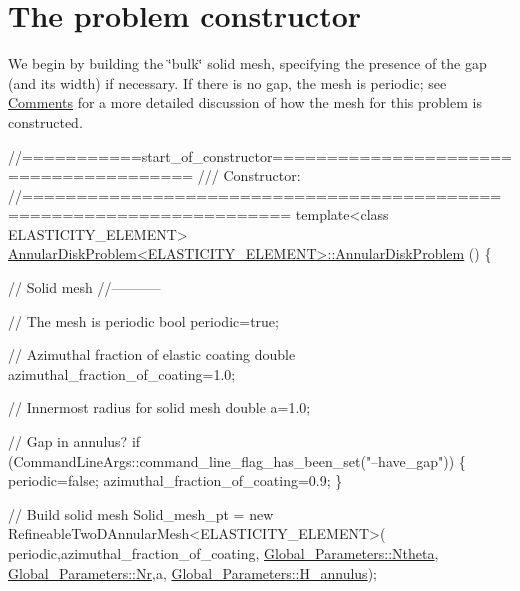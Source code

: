  

\hypertarget{index_constructor}{}\section{The problem constructor}\label{index_constructor}
We begin by building the \char`\"{}bulk\char`\"{} solid mesh, specifying the presence of the gap (and its width) if necessary. If there is no gap, the mesh is periodic; see \hyperlink{index_comments}{Comments} for a more detailed discussion of how the mesh for this problem is constructed.

 
\begin{DoxyCodeInclude}
\textcolor{comment}{//===========start\_of\_constructor======================================= }
\textcolor{comment}{/// Constructor: }
\textcolor{comment}{}\textcolor{comment}{//====================================================================== }
\textcolor{keyword}{template}<\textcolor{keyword}{class} ELASTICITY\_ELEMENT>
\hyperlink{classAnnularDiskProblem_aad1ce56fa5c26045fb14d46acf29c89e}{AnnularDiskProblem<ELASTICITY\_ELEMENT>::AnnularDiskProblem}
      () 
\{
 
 \textcolor{comment}{// Solid mesh}
 \textcolor{comment}{//-----------}

 \textcolor{comment}{// The mesh is periodic }
 \textcolor{keywordtype}{bool} periodic=\textcolor{keyword}{true};

 \textcolor{comment}{// Azimuthal fraction of elastic coating}
 \textcolor{keywordtype}{double} azimuthal\_fraction\_of\_coating=1.0;

 \textcolor{comment}{// Innermost radius for solid mesh}
 \textcolor{keywordtype}{double} a=1.0;
 
 \textcolor{comment}{// Gap in annulus?}
 \textcolor{keywordflow}{if} (CommandLineArgs::command\_line\_flag\_has\_been\_set(\textcolor{stringliteral}{"--have\_gap"}))
  \{
   periodic=\textcolor{keyword}{false};
   azimuthal\_fraction\_of\_coating=0.9;
  \}

\end{DoxyCodeInclude}



\begin{DoxyCodeInclude}
 \textcolor{comment}{// Build solid mesh}
 Solid\_mesh\_pt = \textcolor{keyword}{new} 
  RefineableTwoDAnnularMesh<ELASTICITY\_ELEMENT>(
   periodic,azimuthal\_fraction\_of\_coating,
   \hyperlink{namespaceGlobal__Parameters_a1f67286edeb13ef67687fd483e105b5e}{Global\_Parameters::Ntheta},
   \hyperlink{namespaceGlobal__Parameters_aeebb1e39d849d32cebdc9be13026606e}{Global\_Parameters::Nr},a,
   \hyperlink{namespaceGlobal__Parameters_a0b73c5ead1114ae88bbd4cb0eb54f078}{Global\_Parameters::H\_annulus});

\end{DoxyCodeInclude}


